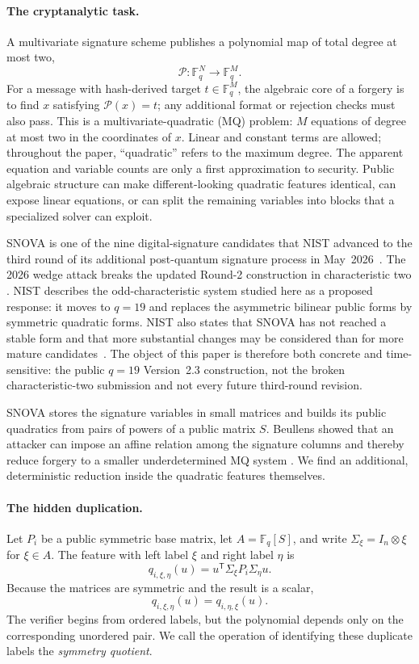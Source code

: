 \documentclass[11pt]{article}
\newcommand{\F}{\mathbb F}
\newcommand{\transpose}{\mathsf T}
\newcommand{\SNOVA}{\textsf{SNOVA}}
\begin{document}
\paragraph{The cryptanalytic task.}
A multivariate signature scheme publishes a polynomial map of total degree
at most two,
\[
  \mathcal P:\F_q^{N}\longrightarrow\F_q^{M}.
\]
For a message with hash-derived target $t\in\F_q^M$, the algebraic core of a
forgery is to find $x$ satisfying $\mathcal P(x)=t$; any additional format or
rejection checks must also pass.  This is a multivariate-quadratic (MQ)
problem: $M$ equations of degree at most two in the coordinates of $x$.  Linear and constant terms are
allowed; throughout the paper, ``quadratic'' refers to the maximum degree.
The apparent equation and variable counts are only a first approximation to
security.  Public algebraic structure can make different-looking quadratic
features identical, can expose linear equations, or can split the remaining
variables into blocks that a specialized solver can exploit.

\SNOVA{} is one of the nine digital-signature candidates that NIST advanced to
the third round of its additional post-quantum signature process in
May~2026~\cite{NISTThirdRound2026,NISTIR8610}.  The 2026 wedge attack breaks
the updated Round-2 construction in characteristic two
\cite{BrosEtAl2026SNOVAWedge}.  NIST describes the odd-characteristic system
studied here as a proposed response: it moves to $q=19$ and replaces the
asymmetric bilinear public forms by symmetric quadratic forms.  NIST also
states that \SNOVA{} has not reached a stable form and that more substantial
changes may be considered than for more mature candidates~\cite{NISTIR8610}.
The object of this paper is therefore both concrete and time-sensitive: the
public $q=19$ Version~2.3 construction, not the broken characteristic-two
submission and not every future third-round revision.

\SNOVA{} stores the signature variables in small matrices and builds its public
quadratics from pairs of powers of a public matrix $S$.  Beullens showed that
an attacker can impose an affine relation among the signature columns and
thereby reduce forgery to a smaller underdetermined MQ system
\cite{Beullens2024SNOVA}.  We find an additional, deterministic reduction
inside the quadratic features themselves.

\paragraph{The hidden duplication.}
Let $P_i$ be a public symmetric base matrix, let
$A=\F_q[S]$, and write $\Sigma_\xi=I_n\otimes\xi$ for $\xi\in A$.  The feature
with left label $\xi$ and right label $\eta$ is
\[
  q_{i,\xi,\eta}(u)
  =u^\transpose\Sigma_\xi P_i\Sigma_\eta u.
\]
Because the matrices are symmetric and the result is a scalar,
\begin{equation}\label{eq:intro-swap}
  q_{i,\xi,\eta}(u)=q_{i,\eta,\xi}(u).
\end{equation}
The verifier begins from ordered labels, but the polynomial depends only on
the corresponding unordered pair.  We call the operation of identifying
these duplicate labels the \emph{symmetry quotient}.
\end{document}
